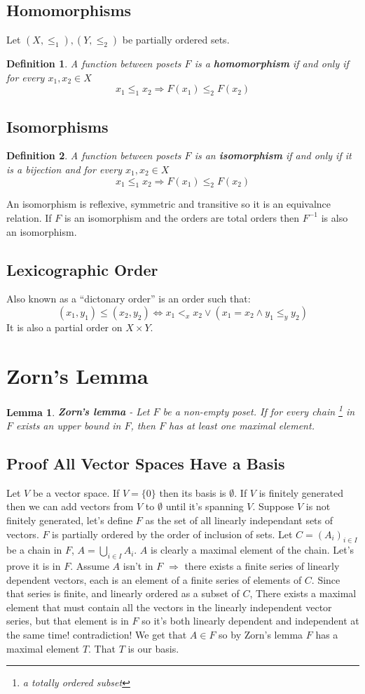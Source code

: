 \documentclass{article}
\theoremstyle{plain}
\newtheorem{lemma}[theorem]{Lemma}
\newtheorem{definition}{Definition}[section]
\begin{document}
\subsection{Homomorphisms}
Let $(X,\le_1) , (Y,\le_2)$ be partially ordered sets.
\begin{definition}
A function between posets $F$ is a \textbf{homomorphism} if and only if
for every $x_1,x_2 \in X$ 
\[
	x_1 \le_1 x_2 \Rightarrow F(x_1) \le_2 F(x_2)
\]
\end{definition}
\subsection{Isomorphisms}
\begin{definition}
A function between posets $F$ is an \textbf{isomorphism} if and only if
it is a bijection and for every $x_1,x_2 \in X$ 
\[
	x_1 \le_1 x_2 \Rightarrow F(x_1) \le_2 F(x_2)
\]
\end{definition}
\noindent An isomorphism is reflexive, symmetric and transitive so it is 
an equivalnce relation. If $F$ is an isomorphism and the orders are 
total orders then $F^{-1}$ is also an isomorphism.
\subsection{Lexicographic Order}
Also known as a ``dictonary order'' is an order such that:
\[
	(x_1,y_1) \le (x_2,y_2) 
	\iff 
	x_1 <_{x} x_2 \lor (x_1=x_2 \land y_1 \le_{y} y_2)
\]
It is also a partial order on $X\times Y$.

\newpage
\section{Zorn's Lemma}
\begin{lemma}
\textbf{Zorn's lemma} - Let $F$ be a non-empty poset.
If for every chain
\footnote{a totally ordered subset} 
in $F$ exists an upper bound in $F$, then $F$ has at least one maximal element.
\end{lemma}
\subsection{Proof All Vector Spaces Have a Basis}
Let $V$ be a vector space. If $V=\{0\}$ then its basis is $\emptyset$.
If $V$ is finitely generated then we can add vectors from $V$ to 
$\emptyset$ until it's spanning $V$.
Suppose $V$ is not finitely generated, let's define $F$ as the set 
of all linearly independant sets of vectors.
$F$ is partially ordered by the order of inclusion of sets.
Let $C=(A_i)_{i\in I}$ be a chain in $F$, $A=\bigcup_{i\in I}A_i$. 
$A$ is clearly a maximal element of the chain. Let's prove it is in $F$.
Assume $A$ isn't in $F$ $\Rightarrow$ there exists a finite series of 
linearly dependent vectors, each is an element of a finite series of 
elements of $C$. Since that series is finite, and linearly ordered as 
a subset of $C$, There exists a maximal element that must contain 
all the vectors in the linearly independent vector series, but that 
element is in $F$ so it's both linearly dependent and independent at 
the same time! contradiction! We get that $A\in F$ so by Zorn's 
lemma $F$ has a maximal element $T$. That $T$ is our basis.
\end{document}
